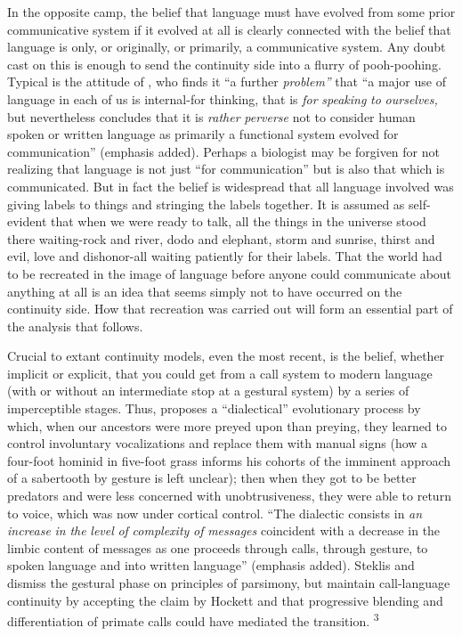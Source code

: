 In the opposite camp, the belief that language must have evolved from some prior communicative system if it evolved at all is clearly connected with the belief that language is only, or originally, or pri\-marily, a communicative system. Any doubt cast on this is enough to send the continuity side into a flurry of pooh-poohing. Typical is the attitude of \citet[175]{Young1978}, who finds it ``a further \textit{problem'' }that ``a major use of language in each of us is internal-for thinking, that is \textit{for} \textit{speaking} \textit{to} \textit{ourselves,{\textquotedbl}} but nevertheless concludes that it is \textit{{\textquotedbl}rather} \textit{perverse }not to consider human spoken or written language as primarily a functional system evolved for communication'' (emphasis added). Perhaps a biologist may be forgiven for not realizing that language is not just ``for communication'' but is also that which is com\-municated. But in fact the belief is widespread that all language in\-volved was giving labels to things and stringing the labels together. It is assumed as self-evident that when we were ready to talk, all the things in the universe stood there waiting-rock and river, dodo and elephant, storm and sunrise, thirst and evil, love and dishonor-all waiting patiently for their labels. That the world had to be recreated in the image of language before anyone could communicate about any\-thing at all is an idea that seems simply not to have occurred on the continuity side. How that recreation was carried out will form an essential part of the analysis that follows.

Crucial to extant continuity models, even the most recent, is
the belief, whether implicit or explicit, that you could get from a call system to modern language (with or without an intermediate stop at a gestural system) by a series of imperceptible stages. Thus, \citet{Stephenson1979} proposes a ``dialectical'' evolutionary process by which, when our ancestors were more preyed upon than preying, they learned to control involuntary vocalizations and replace them with manual signs (how a four-foot hominid in five-foot grass informs his cohorts of the imminent approach of a sabertooth by gesture is left unclear); then when they got to be better predators and were less concerned with unobtrusiveness, they were able to return to voice, which was now under cortical control. ``The dialectic consists in \textit{an} \textit{increase} \textit{in} \textit{the} \textit{level} \textit{o}\textit{f} \textit{complexity} \textit{of} \textit{messages} coincident with a decrease in the limbic content of messages as one proceeds through calls, through gesture, to spoken language and into written language'' (emphasis added). Steklis and \citet{Raleigh1979} dismiss the gestural phase on principles of parsimony, but maintain call-language continuity by accepting the claim by Hockett and \citet{Ascher1964} that progressive blending and differentiation of primate calls could have mediated the transition. \textsuperscript{3}

